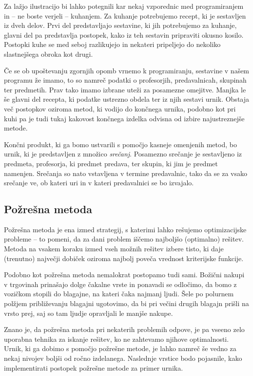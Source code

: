 \documentclass[a4paper,10pt]{article}
\begin{document}
Za lažjo ilustracijo bi lahko potegnili kar nekaj vzporednic med programiranjem in – ne boste verjeli – kuhanjem. Za kuhanje potrebujemo recept, ki je sestavljen iz dveh delov. Prvi del predstavljajo sestavine, ki jih potrebujemo za kuhanje, glavni del pa predstavlja postopek, kako iz teh sestavin pripraviti okusno kosilo. Postopki kuhe se med seboj razlikujejo in nekateri pripeljejo do nekoliko slastnejšega obroka kot drugi.

Če se ob upoštevanju zgornjih opomb vrnemo k programiranju, sestavine v našem programu že imamo, to so namreč podatki o profesorjih, predavalnicah, skupinah ter predmetih. Prav tako imamo izbrane uteži za posamezne omejitve. Manjka le še glavni del recepta, ki podatke ustrezno obdela ter iz njih sestavi urnik. Obstaja več postopkov oziroma metod, ki vodijo do končnega urnika, podobno kot pri kuhi pa je tudi tukaj kakovost končnega izdelka odvisna od izbire najustreznejše metode.

Končni produkt, ki ga bomo ustvarili s pomočjo kasneje omenjenih metod, bo urnik, ki je predstavljen z množico \emph{srečanj}. Posamezno srečanje je sestavljeno iz predmeta, profesorja, ki predmet predava, ter skupin, ki jim je predmet namenjen. Srečanja so nato vstavljena v termine predavalnic, tako da se za vsako srečanje ve, ob kateri uri in v kateri predavalnici se bo izvajalo.
\subsection{Požrešna metoda}
Požrešna metoda je ena izmed strategij, s katerimi lahko rešujemo optimizacijske probleme – to pomeni, da za dani problem iščemo najboljšo (optimalno) rešitev. Metoda na vsakem koraku izmed vseh možnih rešitev izbere tisto, ki daje (trenutno) največji dobiček oziroma najbolj poveča vrednost kriterijske funkcije.

Podobno kot požrešna metoda nemalokrat postopamo tudi sami. Božični nakupi v trgovinah prinašajo dolge čakalne vrste in ponavadi se odločimo, da bomo z vozičkom stopili do blagajne, na kateri čaka najmanj ljudi. Šele po polurnem polžjem približevanju blagajni ugotovimo, da bi pri večini drugih blagajn prišli na vrsto prej, saj so tam ljudje opravljali le manjše nakupe.

Znano je, da požrešna metoda pri nekaterih problemih odpove, je pa vseeno zelo uporabna tehnika za iskanje rešitev, ko ne zahtevamo njihove optimalnosti. Urnik, ki ga dobimo s pomočjo požrešne metode, je lahko namreč še vedno za nekaj nivojev boljši od ročno izdelanega. Naslednje vrstice bodo pojasnile, kako implementirati postopek požrešne metode za primer urnika.
\end{document}
